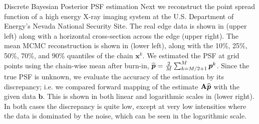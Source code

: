 \begin{chapter}{Discrete Bayesian Posterior PSF estimation}
Next we reconstruct the point spread function of a high energy X-ray imaging system at the U.S. Department of Energy's Nevada National Security Site. The real edge data is shown in  (upper left) along with a horizontal cross-section across the edge (upper right). The mean MCMC reconstruction is shown in  (lower left), along with the 10\%, 25\%, 50\%, 70\%, and 90\% quantiles of the chain $\bm{x}^{k}$.
We estimated the PSF at grid points using the chain-wise mean after burn-in, $\widehat {\mbox{\boldmath$p$}} = \frac 2M \sum_{k=M/2+1}^M {\mbox{\boldmath$p$}}^{k}$.
Since the true PSF is unknown, we evaluate the accuracy of the estimation by its discrepancy; i.e. we compared forward mapping of the estimate ${\bf A} {\widehat{\mbox{\boldmath$p$}}}$ with the given data $\bm b$.  This is shown in both linear and logarithmic scales in  (lower right). 
In both cases the discrepancy is quite low, except at very low intensities where the data is dominated by the noise, which can be seen in the logarithmic scale.


\end{chapter}
